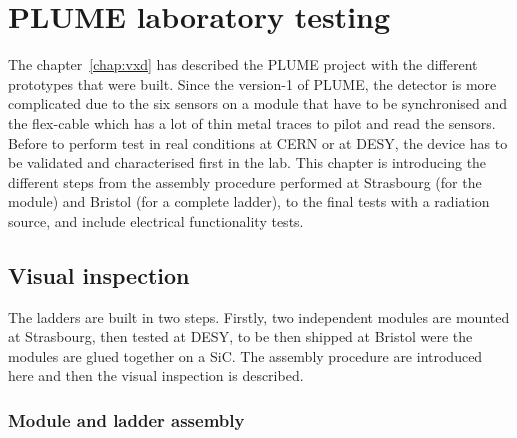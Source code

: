 \chapter{PLUME laboratory testing}
\label{chap:labTests}

  The chapter~\ref{chap:vxd} has described the \gls{PLUME} project with the different prototypes that were built. 
  Since the version-1 of \gls{PLUME}, the detector is more complicated due to the six sensors on a module that have to be synchronised and the flex-cable which has a lot of thin metal traces to pilot and read the sensors.
  Before to perform test in real conditions at CERN or at DESY, the device has to be validated and characterised first in the lab.
  This chapter is introducing the different steps from the assembly procedure performed at Strasbourg (for the module) and Bristol (for a complete ladder), to the final tests with a radiation source, and include electrical functionality tests.

 
 \minitoc
  

\section{Visual inspection}

  The ladders are built in two steps. 
  Firstly, two independent modules are mounted at Strasbourg, then tested at DESY, to be then shipped at Bristol were the modules are glued together on a \gls{SiC}.
  The assembly procedure are introduced here and then the visual inspection is described.

  \subsection{Module and ladder assembly}


